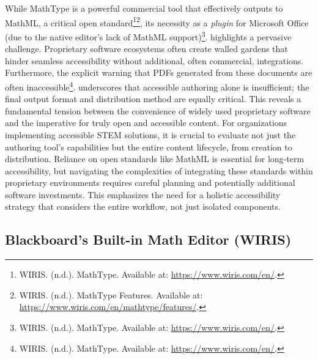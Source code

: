 While MathType is a powerful commercial tool that effectively outputs to MathML, a critical open standard\footnote{WIRIS. (n.d.). MathType. Available at: \url{https://www.wiris.com/en/}.}\footnote{WIRIS. (n.d.). MathType Features. Available at: \url{https://www.wiris.com/en/mathtype/features/}.}, its necessity as a \textit{plugin} for Microsoft Office (due to the native editor's lack of MathML support)\footnote{WIRIS. (n.d.). MathType. Available at: \url{https://www.wiris.com/en/}.}. highlights a pervasive challenge. Proprietary software ecosystems often create walled gardens that hinder seamless accessibility without additional, often commercial, integrations. Furthermore, the explicit warning that PDFs generated from these documents are often inaccessible\footnote{WIRIS. (n.d.). MathType. Available at: \url{https://www.wiris.com/en/}.}. underscores that accessible authoring alone is insufficient; the final output format and distribution method are equally critical. This reveals a fundamental tension between the convenience of widely used proprietary software and the imperative for truly open and accessible content. For organizations implementing accessible STEM solutions, it is crucial to evaluate not just the authoring tool's capabilities but the entire content lifecycle, from creation to distribution. Reliance on open standards like MathML is essential for long-term accessibility, but navigating the complexities of integrating these standards within proprietary environments requires careful planning and potentially additional software investments. This emphasizes the need for a holistic accessibility strategy that considers the entire workflow, not just isolated components.

\subsection{Blackboard's Built-in Math Editor (WIRIS)}


